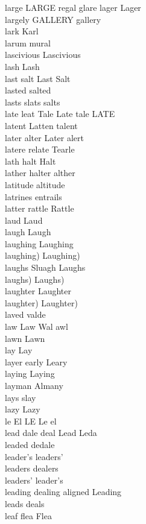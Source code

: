 large LARGE regal glare lager Lager\\
largely GALLERY gallery\\
lark Karl\\
larum mural\\
lascivious Lascivious\\
lash Lash\\
last salt Last Salt\\
lasted salted\\
lasts slats salts\\
late leat Tale Late tale LATE\\
latent Latten talent\\
later alter Later alert\\
latere relate Tearle\\
lath halt Halt\\
lather halter alther\\
latitude altitude\\
latrines entrails\\
latter rattle Rattle\\
laud Laud\\
laugh Laugh\\
laughing Laughing\\
laughing) Laughing)\\
laughs Sluagh Laughs\\
laughs) Laughs)\\
laughter Laughter\\
laughter) Laughter)\\
laved valde\\
law Law Wal awl\\
lawn Lawn\\
lay Lay\\
layer early Leary\\
laying Laying\\
layman Almany\\
lays slay\\
lazy Lazy\\
le El LE Le el\\
lead dale deal Lead Leda\\
leaded dedale\\
leader's leaders'\\
leaders dealers\\
leaders' leader's\\
leading dealing aligned Leading\\
leads deals\\
leaf flea Flea\\
